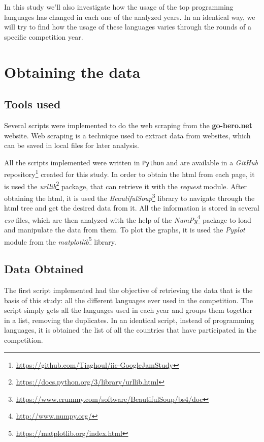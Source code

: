 \documentclass{article}
\begin{document}
\begin{multicols*}{2}
In this study we'll also investigate how the usage of the top programming languages has changed in each one of the analyzed years. In an identical way, we will try to find how the usage of these languages varies through the rounds of a specific competition year.





\section{Obtaining the data}

\subsection{Tools used}

Several scripts were implemented to do the web scraping from the \textbf{go-hero.net} website. Web scraping is a technique used to extract data from websites\cite{web_sc}, which can be saved in local files for later analysis.

All the scripts implemented were written in \texttt{Python} and are available in a \textit{GitHub} repository\footnote{\url{https://github.com/Tiaghoul/iic-GoogleJamStudy}} created for this study. In order to obtain the html from each page, it is used the \textit{urllib}\footnote{\url{https://docs.python.org/3/library/urllib.html}} package, that can retrieve it with the \textit{request} module. After obtaining the html, it is used the \textit{BeautifulSoup}\footnote{\url{https://www.crummy.com/software/BeautifulSoup/bs4/doc}} library to navigate through the html tree and get the desired data from it. All the information is stored in several \textit{csv} files, which are then analyzed with the help of the \textit{NumPy}\footnote{\url{http://www.numpy.org/}} package to load and manipulate the data from them. To plot the graphs, it is used the \textit{Pyplot} module from the \textit{matplotlib}\footnote{\url{https://matplotlib.org/index.html}} library.


\subsection{Data Obtained}

The first script implemented had the objective of retrieving the data that is the basis of this study: all the different languages ever used in the competition. The script simply gets all the languages used in each year and groups them together in a list, removing the duplicates. In an identical script, instead of programming languages, it is obtained the list of all the countries that have participated in the competition.


\end{multicols*}
\end{document}
